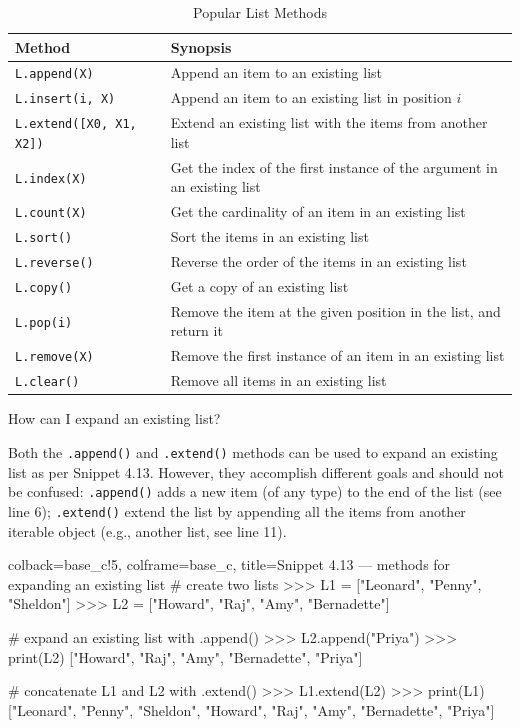 \documentclass[a4paper,11pt]{book}
\newcommand{\question}[1]{%
    \begin{tcolorbox}[colback=comp_c!10,colframe=comp_c,sidebyside align=top,width=\linewidth,before skip=1ex]
        #1
    \end{tcolorbox}
    \switchcolumn%
}
\newcommand{\note}[1]{%
    \begin{tcolorbox}[colback=white!0,colframe=white!10,width=\linewidth,before skip=1ex]
        #1
    \end{tcolorbox}
}
\begin{document}
\begin{table}[!htbp]
	\caption{Popular List Methods}
	\label{tab:list_methods}
	\centering
	\begin{tabular}{ll}
		\toprule \toprule
		Method & Synopsis \\
		\midrule 
		\texttt{L.append(X)} & Append an item to an existing list\\
		\texttt{L.insert(i, X)} & Append an item to an existing list in position $i$ \\
		\texttt{L.extend([X0, X1, X2])} & Extend an existing list with the items from another list\\
		\texttt{L.index(X)} & Get the index of the first instance of the argument in an existing list\\
		\texttt{L.count(X)} & Get the cardinality of an item in an existing list\\
		\texttt{L.sort()} & Sort the items in an existing list\\
		\texttt{L.reverse()} & Reverse the order of the items in an existing list\\
		\texttt{L.copy()} & Get a copy of an existing list\\
		\texttt{L.pop(i)} & Remove the item at the given position in the list, and return it\\
		\texttt{L.remove(X)} & Remove the first instance of an item in an existing list\\
		\texttt{L.clear()} & Remove all items in an existing list\\
		\bottomrule 
	\end{tabular}
\end{table}

\begin{paracol}{2}
	\question{\raggedright How can I expand an existing list?}
	\note{Both the \texttt{.append()} and \texttt{.extend()} methods can be used to expand an existing list as per Snippet 4.13. However, they accomplish different goals and should not be confused: \texttt{.append()} adds a new item (of any type) to the end of the list (see line 6); \texttt{.extend()} extend the list by appending all the items from another iterable object (e.g., another list, see line 11).}
\end{paracol}

\begin{pythoncode}[linenos=true,]{colback=base_c!5, colframe=base_c, title=\sffamily Snippet 4.13 --- methods for expanding an existing list}
# create two lists 
>>> L1 = ["Leonard", "Penny", "Sheldon"]
>>> L2 = ["Howard", "Raj", "Amy", "Bernadette"]

# expand an existing list with .append()
>>> L2.append("Priya") 
>>> print(L2)
["Howard", "Raj", "Amy", "Bernadette", "Priya"]

# concatenate L1 and L2 with .extend()
>>> L1.extend(L2)
>>> print(L1)
["Leonard", "Penny", "Sheldon", "Howard", "Raj", "Amy", "Bernadette", "Priya"]

\end{pythoncode}
\end{document}
